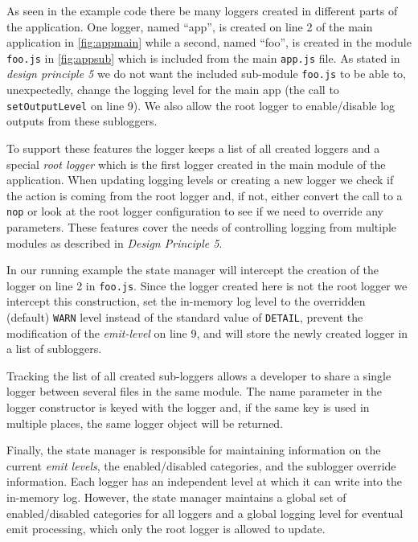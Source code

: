 As seen in the example code there be many loggers 
created in different parts of the application. One logger, named ``app'', is created on line 
2 of the main application in \autoref{fig:appmain} while a second, named ``foo'', is created 
in the module \texttt{foo.js} in \autoref{fig:appsub} which is included from 
the main \texttt{app.js} file. As stated in \emph{design principle 5} we 
do not want the included sub-module \texttt{foo.js} to be able to, unexpectedly, 
change the logging level for the main app (the call to \texttt{setOutputLevel} on 
line 9). We also allow the root logger to enable/disable log outputs 
from these subloggers. 

To support these features the \projn logger keeps a list of all created loggers 
and a special \emph{root logger} which is the first logger created in the main 
module of the application. When updating logging levels or creating a new logger 
we check if the action is coming from the root logger and, if not, either convert 
the call to a \texttt{nop} or look at the root logger configuration to see if 
we need to override any parameters. These features cover the needs of controlling 
logging from multiple modules as described in \emph{Design Principle 5}.

In our running example the state manager will intercept the creation of the logger 
on line 2 in \texttt{foo.js}. Since the logger created here is not the root logger
we intercept this construction, set the in-memory log level to 
the overridden (default) \texttt{WARN} level instead of the standard value of \texttt{DETAIL}, 
prevent the modification of the \emph{emit-level} on line 9, and will 
store the newly created logger in a list of subloggers. 

Tracking the list of all created sub-loggers allows a developer to share a 
single logger between several files in the same module. The name parameter in the 
logger constructor is keyed with the logger and, if the same key is used in multiple 
places, the same logger object will be returned.

Finally, the state manager is responsible for maintaining information on the current 
\emph{emit levels}, the enabled/disabled categories, and the sublogger override information. 
Each logger has an independent level at which it can write into the in-memory log. However,  
the state manager maintains a global set of enabled/disabled categories for all loggers 
and a global logging level for eventual emit processing, which only the root logger is 
allowed to update. 

